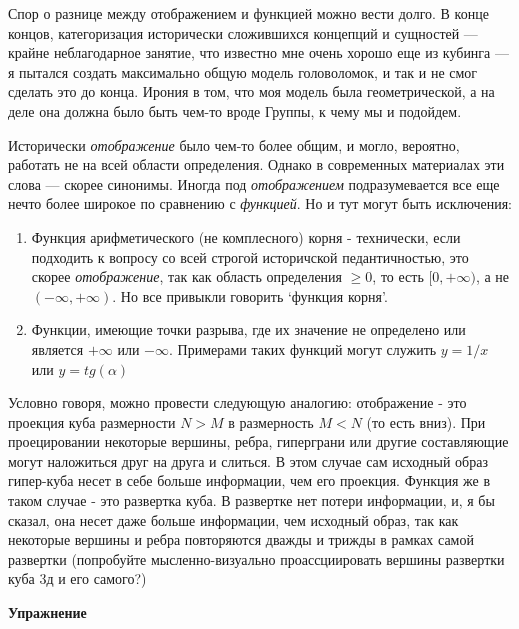 \documentclass{book}
\begin{document}
\begin{enumerate}[label=\arabic*., parsep=4pt, itemsep=4pt, topsep=4pt, partopsep=0pt]
Спор о разнице между отображением и функцией можно вести долго. В конце концов, категоризация исторически сложившихся концепций и сущностей — крайне неблагодарное занятие, что известно мне очень хорошо еще из кубинга — я пытался создать максимально общую модель головоломок, и так и не смог сделать это до конца. Ирония в том, что моя модель была геометрической, а на деле она должна было быть чем-то вроде Группы, к чему мы и подойдем.  

Исторически \textit{отображение} было чем-то более общим, и могло, вероятно, работать не на всей области определения. Однако в современных материалах эти слова — скорее синонимы. Иногда под \textit{отображением} подразумевается все еще нечто более широкое по сравнению с \textit{функцией}. Но и тут могут быть исключения:

\end{enumerate}

\begin{enumerate}[label=\arabic*., parsep=4pt, itemsep=4pt, topsep=4pt, partopsep=0pt]

\item Функция арифметического (не комплесного) корня - технически, если подходить к вопросу со всей строгой историчской педантичностью, это скорее \textit{отображение}, так как область определения $\ge 0$, то есть $[0, +\infty)$, а не $(-\infty, +\infty)$. Но все привыкли говорить `функция корня'.

\item Функции, имеющие точки разрыва, где их значение не определено или является $+\infty$ или $-\infty$. Примерами таких функций могут служить $y = 1/x$ или $y = tg(\alpha)$

\end{enumerate}

Условно говоря, можно провести следующую аналогию: отображение - это проекция куба размерности $N>M$ в размерность $M<N$ (то есть вниз). При проецировании некоторые вершины, ребра, гиперграни или другие составляющие могут наложиться друг на друга и слиться. В этом случае сам исходный образ гипер-куба несет в себе больше информации, чем его проекция. Функция же в таком случае - это развертка куба. В развертке нет потери информации, и, я бы сказал, она несет даже больше информации, чем исходный образ, так как некоторые вершины и ребра повторяются дважды и трижды в рамках самой развертки (попробуйте мысленно-визуально проассциировать вершины развертки куба 3д и его самого?)

\textbf{Упражнение}
\end{document}

